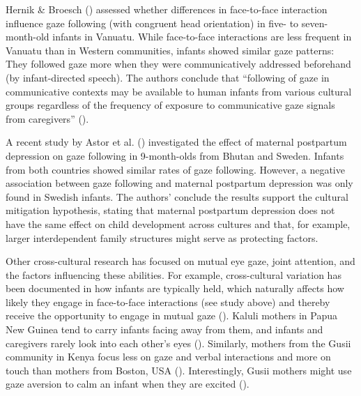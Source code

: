 \documentclass[
]{scrbook}
\begin{document}
Hernik \& Broesch () assessed whether differences in face-to-face interaction influence gaze following (with congruent head orientation) in five- to seven-month-old infants in Vanuatu. While face-to-face interactions are less frequent in Vanuatu than in Western communities, infants showed similar gaze patterns: They followed gaze more when they were communicatively addressed beforehand (by infant-directed speech). The authors conclude that ``following of gaze in communicative contexts may be available to human infants from various cultural groups regardless of the frequency of exposure to communicative gaze signals from caregivers'' ().

A recent study by Astor et al. () investigated the effect of maternal postpartum depression on gaze following in 9-month-olds from Bhutan and Sweden. Infants from both countries showed similar rates of gaze following. However, a negative association between gaze following and maternal postpartum depression was only found in Swedish infants. The authors' conclude the results support the cultural mitigation hypothesis, stating that maternal postpartum depression does not have the same effect on child development across cultures and that, for example, larger interdependent family structures might serve as protecting factors.

Other cross-cultural research has focused on mutual eye gaze, joint attention, and the factors influencing these abilities. For example, cross-cultural variation has been documented in how infants are typically held, which naturally affects how likely they engage in face-to-face interactions (see study above) and thereby receive the opportunity to engage in mutual gaze (). Kaluli mothers in Papua New Guinea tend to carry infants facing away from them, and infants and caregivers rarely look into each other's eyes (). Similarly, mothers from the Gusii community in Kenya focus less on gaze and verbal interactions and more on touch than mothers from Boston, USA (). Interestingly, Gusii mothers might use gaze aversion to calm an infant when they are excited ().
\end{document}
